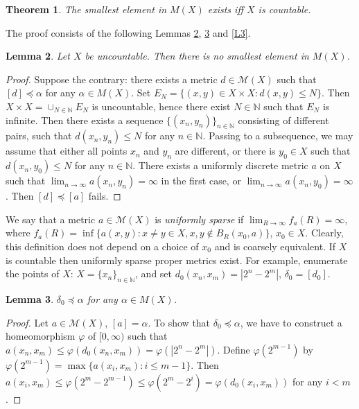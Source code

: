 \documentclass[reqno,12pt]{amsart}
\theoremstyle{plain}%
\newtheorem{thm}{Theorem}[section]
\newtheorem{lem}[thm]{Lemma}
\theoremstyle{definition}
\theoremstyle{remark}
\numberwithin{equation}{section}
\begin{document}
\begin{thm}
The smallest element in $M(X)$ exists iff $X$ is countable.
\end{thm}

The proof consists of the following Lemmas \ref{L1}, \ref{L2} and \ref{L3}.

\begin{lem}\label{L1}
Let $X$ be uncountable. Then there is no smallest element in $M(X)$.

\end{lem}
\begin{proof}
Suppose the contrary: there exists a metric $d\in\mathcal M(X)$ such that $[d]\preceq\alpha$ for any $\alpha\in M(X)$. Set $E_N=\{(x,y)\in X\times X:d(x,y)\leq N\}$. Then $X\times X=\cup_{N\in\mathbb N} E_N$ is uncountable, hence there exist $N\in\mathbb N$ such that $E_N$ is infinite. Then there exists a sequence $\{(x_n,y_n)\}_{n\in\mathbb N}$ consisting of different pairs, such that $d(x_n,y_n)\leq N$ for any $n\in\mathbb N$. Passing to a subsequence, we may assume that either all points $x_n$ and $y_n$ are different, or there is $y_0\in X$ such that $d(x_n,y_0)\leq N$ for any $n\in\mathbb N$. There exists a uniformly discrete metric $a$ on $X$ such that $\lim_{n\to\infty}a(x_n,y_n)=\infty$ in the first case, or $\lim_{n\to\infty}a(x_n,y_0)=\infty$. Then $[d]\preceq[a]$ fails.
\end{proof}



We say that a metric $a\in\mathcal M(X)$ is \emph{uniformly sparse} if $\lim_{R\to\infty}f_a(R)=\infty$, where $f_a(R)=\inf\{a(x,y):x\neq y\in X, x,y\notin B_R(x_0,a)\}$, $x_0\in X$. Clearly, this definition does not depend on a choice of $x_0$ and is coarsely equivalent. If $X$ is countable then uniformly sparse proper metrics exist. For example, enumerate the points of $X$: $X=\{x_n\}_{n\in\mathbb N}$, and set $d_0(x_n,x_m)=|2^n-2^m|$, $\delta_0=[d_0]$.

\begin{lem}\label{L2}
$\delta_0\preceq\alpha$ for any $\alpha\in M(X)$.

\end{lem}
\begin{proof}
Let $a\in\mathcal M(X)$, $[a]=\alpha$. 
To show that $\delta_0\preceq\alpha$, we have to construct a homeomorphism $\varphi$ of $[0,\infty)$ such that $a(x_n,x_m)\leq\varphi(d_0(x_n,x_m))=\varphi(|2^n-2^m|)$. Define $\varphi(2^{m-1})$ by $\varphi(2^{m-1})=\max\{a(x_i,x_m):i\leq m-1\}$. Then $a(x_i,x_m)\leq \varphi(2^m-2^{m-1})\leq\varphi(2^m-2^i)=\varphi(d_0(x_i,x_m))$ for any $i<m$.
\end{proof} 
\end{document}
